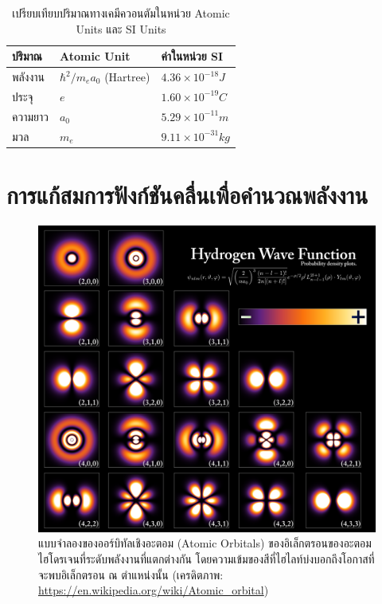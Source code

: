 \begin{table}[htbp]
    \centering
    \caption{เปรียบเทียบปริมาณทางเคมีควอนตัมในหน่วย Atomic Units และ SI Units}
    \label{tab:atomic_units}
    \small
    \begin{tabular}{lll}\toprule
    ปริมาณ &Atomic Unit &ค่าในหน่วย SI \\\midrule
    พลังงาน & $\hbar^{2}/m_{e}a_{0}$ (Hartree) & $4.36 \times 10^{-18} J$ \\
    ประจุ & $e$ & $1.60 \times 10^{-19} C$ \\
    ความยาว & $a_{0}$ & $5.29 \times 10^{-11} m$ \\
    มวล & $m_{e}$ & $9.11 \times 10^{-31} kg$ \\
    \bottomrule
    \end{tabular}
\end{table}

\section{การแก้สมการฟังก์ชันคลื่นเพื่อคำนวณพลังงาน}
\label{sec:wavefunc_ener}

\begin{figure}[htbp]
    \centering
    \includegraphics[width=0.8\linewidth]{fig/hydrogen_density_plots.png}
    \caption{แบบจำลองของออร์บิทัลเชิงอะตอม (Atomic Orbitals) ของอิเล็กตรอนของอะตอมไฮโดรเจนที่ระดับพลังงานที่แตกต่างกัน
    โดยความเข้มของสีที่ไฮไลท์บ่งบอกถึงโอกาสที่จะพบอิเล็กตรอน ณ ตำแหน่งนั้น 
    (เครดิตภาพ: \url{https://en.wikipedia.org/wiki/Atomic_orbital})}
    \label{fig:hydrogen_density}
\end{figure}

